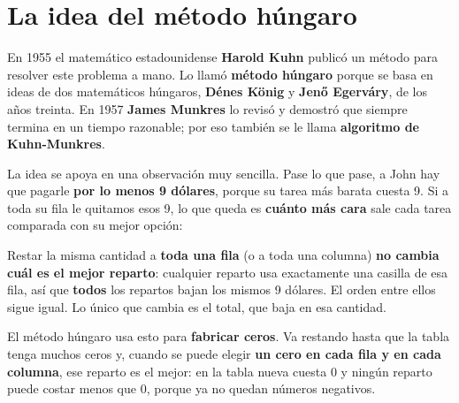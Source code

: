 \documentclass[11pt,a4paper]{article}
\newcommand{\marco}[3]{%
  \foreach \i in {2,...,#2} \foreach \j in {2,...,#3}
    \draw[gray!60, very thin] (#1-\i-\j.north west) rectangle (#1-\i-\j.south east);
  \draw[semithick] (#1-2-2.north west) rectangle (#1-#2-#3.south east);}
\newcommand{\cero}[1]{\node[asig] at (#1) {};}
\newcommand{\flecha}[3]{\draw[-{Stealth[length=2.4mm]}, thick, shorten >=1mm] (#1.east) -- node[above, font=\scriptsize, align=center] {#3} (#1.east -| #2.west);}
\begin{document}
\section{La idea del método húngaro}

En 1955 el matemático estadounidense \textbf{Harold Kuhn} publicó un método para resolver este problema a mano.
Lo llamó \textbf{método húngaro} porque se basa en ideas de dos matemáticos húngaros, \textbf{Dénes König} y
\textbf{Jenő Egerváry}, de los años treinta. En 1957 \textbf{James Munkres} lo revisó y demostró que siempre
termina en un tiempo razonable; por eso también se le llama \textbf{algoritmo de Kuhn-Munkres}.

La idea se apoya en una observación muy sencilla. Pase lo que pase, a John hay que pagarle \textbf{por lo menos
9 dólares}, porque su tarea más barata cuesta 9. Si a toda su fila le quitamos esos 9, lo que queda es
\textbf{cuánto más cara} sale cada tarea comparada con su mejor opción:

\begin{center}
\end{center}

Restar la misma cantidad a \textbf{toda una fila} (o a toda una columna) \textbf{no cambia cuál es el mejor reparto}:
cualquier reparto usa exactamente una casilla de esa fila, así que \textbf{todos} los repartos bajan los mismos
9 dólares. El orden entre ellos sigue igual. Lo único que cambia es el total, que baja en esa cantidad.

El método húngaro usa esto para \textbf{fabricar ceros}. Va restando hasta que la tabla tenga muchos ceros y,
cuando se puede elegir \textbf{un cero en cada fila y en cada columna}, ese reparto es el mejor: en la tabla nueva
cuesta 0 y ningún reparto puede costar menos que 0, porque ya no quedan números negativos.
\end{document}
